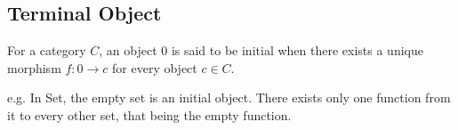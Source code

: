 \subsection{Terminal Object}

For a category $C$, an object $0$ is said to be initial when there exists a
unique morphism $f: 0\to c$ for every object $c\in C$.
\cite{awodey:category_theory}

e.g. In Set, the empty set is an initial object. There exists only one function
from it to every other set, that being the empty function.
